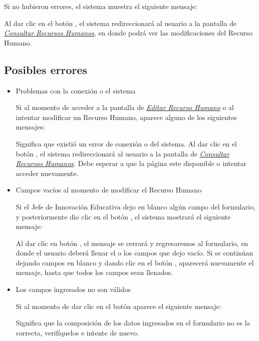         Si no hubieron errores, el sistema muestra el siguiente mensaje:
        
        Al dar clic en el botón , el sistema redireccionará al usuario a la pantalla de \hyperlink{consultarrh}{\textit{Consultar Recursos Humanos}}, en donde podrá ver las modificaciones del Recurso Humano.\\
        
        \subsection{Posibles errores}
    
            \begin{itemize}
            	\item Problemas con la conexión o el sistema
            
                	Si al momento de acceder a la pantalla de \hyperlink{editarrh}{\textit{Editar Recurso Humano}} o al intentar modificar un Recurso Humano, aparece alguno de los siguientes mensajes:
            	    
            
                	Significa que existió un error de conexión o del sistema. Al dar clic en el botón , el sistema redireccionará al usuario a la pantalla de \hyperlink{consultarrh}{\textit{Consultar Recursos Humanos}}. Debe esperar a que la página este disponible o intentar acceder nuevamente.
            
            	\item Campos vacíos al momento de modificar el Recurso Humano
            
                	Si el Jefe de Innovación Educativa dejo en blanco algún campo del formulario, y posteriormente dio clic en el botón , el sistema mostrará el siguiente mensaje:
            	    
            
            	    Al dar clic en botón , el mensaje se cerrará y regresaremos al formulario, en donde el usuario deberá llenar el o los campos que dejo vacío. Si se continúan dejando campos en blanco y dando clic en el botón , aparecerá nuevamente el mensaje, hasta que todos los campos sean llenados.
            
            	\item Los campos ingresados no son válidos
            
                	Si al momento de dar clic en el botón  aparece el siguiente mensaje:
            
                	Significa que la composición de los datos ingresados en el formulario no es la correcta, verifíquelos e intente de nuevo.
            
            \end{itemize}
